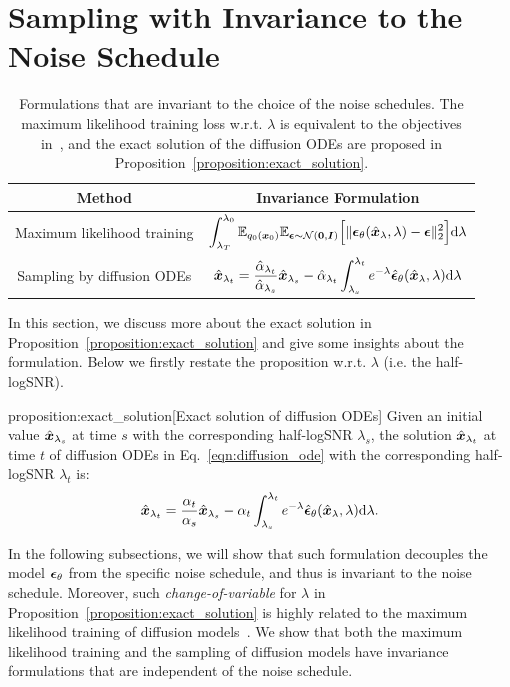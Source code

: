 \section{Sampling with Invariance to the Noise Schedule}
\label{appendix:discuss}
\begin{table}
    \centering
    \caption{Formulations that are invariant to the choice of the noise schedules. The maximum likelihood training loss w.r.t. $\lambda$ is equivalent to the objectives in~\citep{kingma2021variational,song2021maximum}, and the exact solution of the diffusion ODEs are proposed in Proposition~\ref{proposition:exact_solution}.}
    \vskip 0.10in
    \begin{tabular}{c|c}
    \toprule
    Method & Invariance Formulation\\
    \midrule
    Maximum likelihood training & \(\displaystyle \int_{\lambda_T}^{\lambda_0} \mathbb{E}_{q_0(\bm{x}_0)}\mathbb{E}_{\bm{\epsilon}\sim\mathcal{N}(\bm{0},\bm{I})}\Big[\|\bm{\epsilon}_\theta(\hat{\bm{x}}_{\lambda},\lambda)-\bm{\epsilon}\|_2^2\Big]\dd\lambda \) \\
    Sampling by diffusion ODEs & \(\displaystyle \hat{\bm{x}}_{\lambda_t} = \frac{\hat\alpha_{\lambda_t}}{\hat\alpha_{\lambda_s}}\hat{\bm{x}}_{\lambda_s} - \hat\alpha_{\lambda_t} \int_{\lambda_s}^{\lambda_t} e^{-\lambda} \hat{\bm{\epsilon}}_\theta(\hat{\bm{x}}_\lambda,\lambda)\dd\lambda \) \\
    \bottomrule
    \end{tabular}
    \label{tab:invariance}
\end{table}


In this section, we discuss more about the exact solution in Proposition~\ref{proposition:exact_solution} and give some insights about the formulation. Below we firstly restate the proposition w.r.t. $\lambda$ (i.e. the half-logSNR).
\begin{repproposition}{proposition:exact_solution}[Exact solution of diffusion ODEs]
Given an initial value $\hat{\bm{x}}_{\lambda_s}$ at time $s$ with the corresponding half-logSNR $\lambda_s$, the solution $\hat{\bm{x}}_{\lambda_t}$ at time $t$ of diffusion ODEs in Eq.~\eqref{eqn:diffusion_ode} with the corresponding half-logSNR $\lambda_t$ is:
\begin{equation}
    \hat{\bm{x}}_{\lambda_t} = \frac{\alpha_t}{\alpha_s}\hat{\bm{x}}_{\lambda_s} - \alpha_t \int_{\lambda_s}^{\lambda_t} e^{-\lambda} \hat{\bm{\epsilon}}_\theta(\hat{\bm{x}}_\lambda,\lambda)\dd\lambda.
\end{equation}
\end{repproposition}
In the following subsections, we will show that such formulation decouples the model $\bm{\epsilon}_\theta$ from the specific noise schedule, and thus is invariant to the noise schedule. Moreover, such \textit{change-of-variable} for $\lambda$ in Proposition~\ref{proposition:exact_solution} is highly related to the maximum likelihood training of diffusion models~\citep{kingma2021variational,song2021maximum}. We show that both the maximum likelihood training and the sampling of diffusion models have invariance formulations that are independent of the noise schedule.

